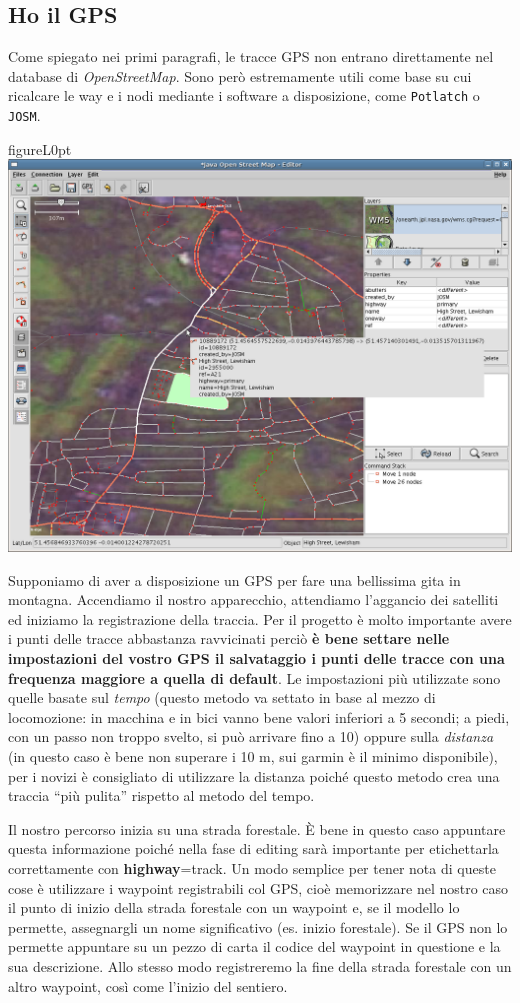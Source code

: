 \documentclass[a4paper,twoside,12pt,]{article}
\newcommand{\osm}{\emph{OpenStreetMap}\xspace}
\newcommand{\gps}{GPS\xspace}
\newcommand{\key}[1]{\textsf{\textbf{#1}}}
\newcommand{\val}[1]{\textsf{#1}}
\newcommand{\soft}[1]{\texttt{#1}}
\begin{document}
\subsection{Ho il \gps}
Come spiegato nei primi paragrafi, le tracce \gps non entrano direttamente nel database di \osm. Sono però estremamente utili come base su cui ricalcare le way e i nodi mediante i software a disposizione, come \soft{Potlatch} o \soft{JOSM}.
\begin{wrapfloat}{figure}{L}{0pt}
 \includegraphics[width=0.6\columnwidth]{Josm-screenshot.png}
 \caption{\textit{L'interfaccia di JOSM}}
\end{wrapfloat}
Supponiamo di aver a disposizione un \gps per fare una bellissima gita in montagna. Accendiamo il nostro apparecchio, attendiamo l'aggancio dei satelliti ed iniziamo la registrazione della traccia. Per il progetto è molto importante avere i punti delle tracce abbastanza ravvicinati perciò \textbf{è bene settare nelle impostazioni del vostro \gps il salvataggio i punti delle tracce con una frequenza maggiore a quella di default}. Le impostazioni più utilizzate sono quelle basate sul \textit{tempo} (questo metodo va settato in base al mezzo di locomozione: in macchina e in bici vanno bene valori inferiori a 5 secondi; a piedi, con un passo non troppo svelto, si può arrivare fino a 10) oppure sulla \textit{distanza} (in questo caso è bene non superare i 10 m, sui garmin è il minimo disponibile), per i novizi è consigliato di utilizzare la distanza poiché questo metodo crea una traccia ``più pulita'' rispetto al metodo del tempo.

Il nostro percorso inizia su una strada forestale. È bene in questo caso appuntare questa informazione poiché nella fase di editing sarà importante per etichettarla correttamente con \key{highway}=\val{track}. Un modo semplice per tener nota di queste cose è utilizzare i waypoint registrabili col \gps, cioè memorizzare nel nostro caso il punto di inizio della strada forestale con un waypoint e, se il modello lo permette, assegnargli un nome significativo (es. inizio forestale). Se il \gps non lo permette appuntare su un pezzo di carta il codice del waypoint in questione e la sua descrizione. Allo stesso modo registreremo la fine della strada forestale con un altro waypoint, così come l'inizio del sentiero.
\end{document}
